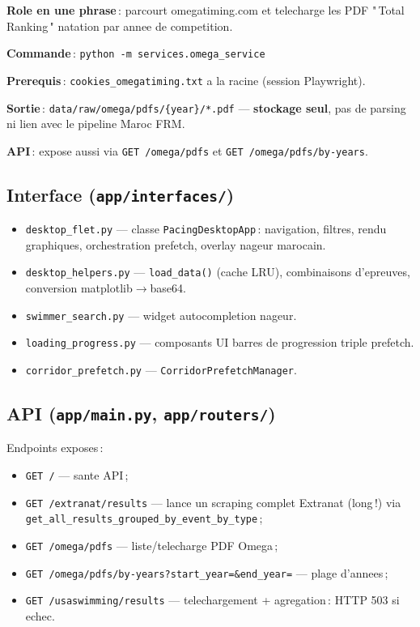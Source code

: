 \documentclass[11pt,a4paper]{article}
\begin{document}
\textbf{Role en une phrase}\,: parcourt omegatiming.com et telecharge les PDF "\,Total Ranking\," natation par annee de competition.

\textbf{Commande}\,: \texttt{python -m services.omega\_service}

\textbf{Prerequis}\,: \texttt{cookies\_omegatiming.txt} a la racine (session Playwright).

\textbf{Sortie}\,: \texttt{data/raw/omega/pdfs/\{year\}/*.pdf} --- \textbf{stockage seul}, pas de parsing ni lien avec le pipeline Maroc FRM.

\textbf{API}\,: expose aussi via \texttt{GET /omega/pdfs} et \texttt{GET /omega/pdfs/by-years}.

\subsection{Interface (\texttt{app/interfaces/})}

\begin{itemize}
  \item \texttt{desktop\_flet.py} --- classe \texttt{PacingDesktopApp}\,: navigation, filtres, rendu graphiques, orchestration prefetch, overlay nageur marocain.
  \item \texttt{desktop\_helpers.py} --- \texttt{load\_data()} (cache LRU), combinaisons d'epreuves, conversion matplotlib$\rightarrow$base64.
  \item \texttt{swimmer\_search.py} --- widget autocompletion nageur.
  \item \texttt{loading\_progress.py} --- composants UI barres de progression triple prefetch.
  \item \texttt{corridor\_prefetch.py} --- \texttt{CorridorPrefetchManager}.
\end{itemize}

\subsection{API (\texttt{app/main.py}, \texttt{app/routers/})}

Endpoints exposes\,:
\begin{itemize}
  \item \texttt{GET /} --- sante API\,;
  \item \texttt{GET /extranat/results} --- lance un scraping complet Extranat (long\,!) via \texttt{get\_all\_results\_grouped\_by\_event\_by\_type}\,;
  \item \texttt{GET /omega/pdfs} --- liste/telecharge PDF Omega\,;
  \item \texttt{GET /omega/pdfs/by-years?start\_year=\&end\_year=} --- plage d'annees\,;
  \item \texttt{GET /usaswimming/results} --- telechargement + agregation\,: HTTP 503 si echec.
\end{itemize}
\end{document}
